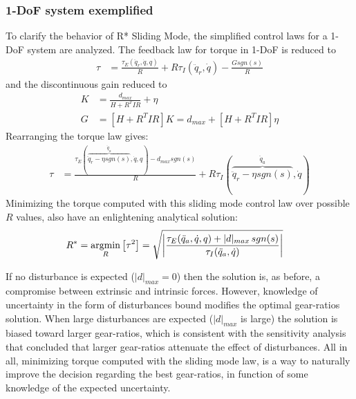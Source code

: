 \subsubsection{1-DoF system exemplified} 

To clarify the behavior of R* Sliding Mode, the simplified control laws for a 1-DoF system are analyzed. The feedback law for torque in 1-DoF is reduced to 
%
\begin{align}
	\tau &=  \frac{\tau_{E}(\ddot{q}_r,\dot{q},q)}{R} 
	+ R \tau_{I}(\ddot{q}_r,\dot{q})
  - \frac{G sgn( s ) }{R} 
\end{align}
%
and the discontinuous gain reduced to 
%
\begin{align}
K &= \frac{d_{max}}{H + R^T I R} + \eta \\
G &= \left[ H + R^T I R \right] K  =  d_{max} + \left[ H + R^T I R \right] \eta 
\end{align}
%
Rearranging the torque law gives:
%
\begin{align}
	\tau &=  \frac{\tau_{E}( \overbrace{ \ddot{q}_r - \eta sgn( s ) }^{\ddot{q}_a},\dot{q},q) - d_{max} sgn( s )  }{R} 
	+ R \tau_{I}(\overbrace{\ddot{q}_r - \eta sgn( s )}^{\ddot{q}_a} ,\dot{q})
\end{align}
%
Minimizing the torque computed with this sliding mode control law over possible $R$ values, also have an enlightening analytical solution:
%
\begin{align}
	R^{*} &= \operatornamewithlimits{argmin}\limits_{R} \left[ \tau^2 \right] = \sqrt{ \left | \frac{\tau_{E}(\ddot{q}_a,\dot{q},q) + | d |_{max} \, sgn( s ) }{\tau_{I}(\ddot{q}_a,\dot{q})} \right |   } 
\label{eq:rstar_sliding}
\end{align}

If no disturbance is expected ($| d |_{max}=0$) then the solution is, as before, a compromise between extrinsic and intrinsic forces. However, knowledge of uncertainty in the form of disturbances bound modifies the optimal gear-ratios solution. When large disturbances are expected ($| d |_{max}$ is large) the solution is biased toward larger gear-ratios, which is consistent with the sensitivity analysis that concluded that larger gear-ratios attenuate the effect of disturbances. All in all, minimizing torque computed with the sliding mode law, is a way to naturally improve the decision regarding the best gear-ratios, in function of some knowledge of the expected uncertainty.
%

